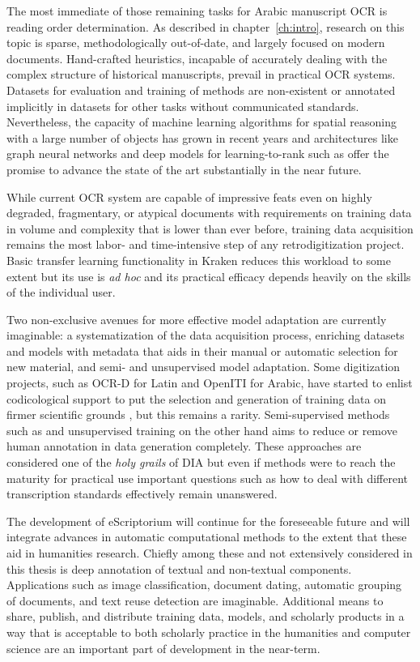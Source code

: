 The most immediate of those remaining tasks for Arabic manuscript OCR is
reading order determination.  As described in chapter~\ref{ch:intro}, research
on this topic is sparse, methodologically out-of-date, and largely focused on
modern documents. Hand-crafted heuristics, incapable of accurately dealing with
the complex structure of historical manuscripts, prevail in practical OCR
systems. Datasets for evaluation and training of methods are non-existent or
annotated implicitly in datasets for other tasks without communicated
standards. Nevertheless, the capacity of machine learning algorithms for
spatial reasoning with a large number of objects has grown in recent years and
architectures like graph neural networks\cite{dejean2019versatile} and deep
models for learning-to-rank such as \cite{tan2019learning,cakir2019deep} offer
the promise to advance the state of the art substantially in the near future.

While current OCR system are capable of impressive feats even on highly
degraded, fragmentary, or atypical documents with requirements on training data
in volume and complexity that is lower than ever before, training data
acquisition remains the most labor- and time-intensive step of any
retrodigitization project. Basic transfer learning functionality in Kraken
reduces this workload to some extent but its use is \emph{ad hoc} and its
practical efficacy depends heavily on the skills of the individual user. 

Two non-exclusive avenues for more effective model adaptation are currently
imaginable: a systematization of the data acquisition process, enriching
datasets and models with metadata that aids in their manual or automatic
selection for new material, and semi- and unsupervised model adaptation. Some
digitization projects, such as OCR-D for Latin and OpenITI for Arabic, have
started to enlist codicological support to put the selection and generation of
training data on firmer scientific grounds \cite{weichselbaumer2020new}, but
this remains a rarity. Semi-supervised methods such as
\cite{keret2019transductive} and unsupervised training \cite{gupta2018learning}
on the other hand aims to reduce or remove human annotation in data generation
completely. These approaches are considered one of the \emph{holy grails} of
DIA but even if methods were to reach the maturity for practical use important
questions such as how to deal with different transcription standards
effectively remain unanswered.

The development of eScriptorium will continue for the foreseeable future and
will integrate advances in automatic computational methods to the extent that
these aid in humanities research. Chiefly among these and not extensively
considered in this thesis is deep annotation of textual and non-textual
components. Applications such as image classification, document dating,
automatic grouping of documents, and text reuse detection are imaginable.
Additional means to share, publish, and distribute training data, models, and
scholarly products in a way that is acceptable to both scholarly practice in
the humanities and computer science are an important part of development in the
near-term.

